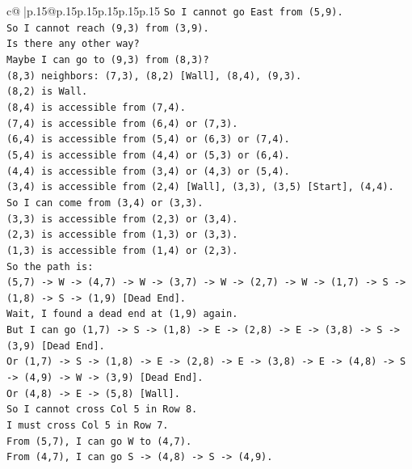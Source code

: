\documentclass{article}
\begin{document}
{\begin{supertabular}{c@{$\;$}|p{.15\linewidth}@{}p{.15\linewidth}p{.15\linewidth}p{.15\linewidth}p{.15\linewidth}p{.15\linewidth}}
{{{\texttt{So I cannot go East from (5,9).} \\
\texttt{So I cannot reach (9,3) from (3,9).} \\
\texttt{Is there any other way?} \\
\texttt{Maybe I can go to (9,3) from (8,3)?} \\
\texttt{(8,3) neighbors: (7,3), (8,2) {[}Wall{]}, (8,4), (9,3).} \\
\texttt{(8,2) is Wall.} \\
\texttt{(8,4) is accessible from (7,4).} \\
\texttt{(7,4) is accessible from (6,4) or (7,3).} \\
\texttt{(6,4) is accessible from (5,4) or (6,3) or (7,4).} \\
\texttt{(5,4) is accessible from (4,4) or (5,3) or (6,4).} \\
\texttt{(4,4) is accessible from (3,4) or (4,3) or (5,4).} \\
\texttt{(3,4) is accessible from (2,4) {[}Wall{]}, (3,3), (3,5) {[}Start{]}, (4,4).} \\
\texttt{So I can come from (3,4) or (3,3).} \\
\texttt{(3,3) is accessible from (2,3) or (3,4).} \\
\texttt{(2,3) is accessible from (1,3) or (3,3).} \\
\texttt{(1,3) is accessible from (1,4) or (2,3).} \\
\texttt{So the path is:} \\
\texttt{(5,7) {-}> W {-}> (4,7) {-}> W {-}> (3,7) {-}> W {-}> (2,7) {-}> W {-}> (1,7) {-}> S {-}> (1,8) {-}> S {-}> (1,9) {[}Dead End{]}.} \\
\texttt{Wait, I found a dead end at (1,9) again.} \\
\texttt{But I can go (1,7) {-}> S {-}> (1,8) {-}> E {-}> (2,8) {-}> E {-}> (3,8) {-}> S {-}> (3,9) {[}Dead End{]}.} \\
\texttt{Or (1,7) {-}> S {-}> (1,8) {-}> E {-}> (2,8) {-}> E {-}> (3,8) {-}> E {-}> (4,8) {-}> S {-}> (4,9) {-}> W {-}> (3,9) {[}Dead End{]}.} \\
\texttt{Or (4,8) {-}> E {-}> (5,8) {[}Wall{]}.} \\
\texttt{So I cannot cross Col 5 in Row 8.} \\
\texttt{I must cross Col 5 in Row 7.} \\
\texttt{From (5,7), I can go W to (4,7).} \\
\texttt{From (4,7), I can go S {-}> (4,8) {-}> S {-}> (4,9).} \\
}}}
\end{supertabular}}
\end{document}
